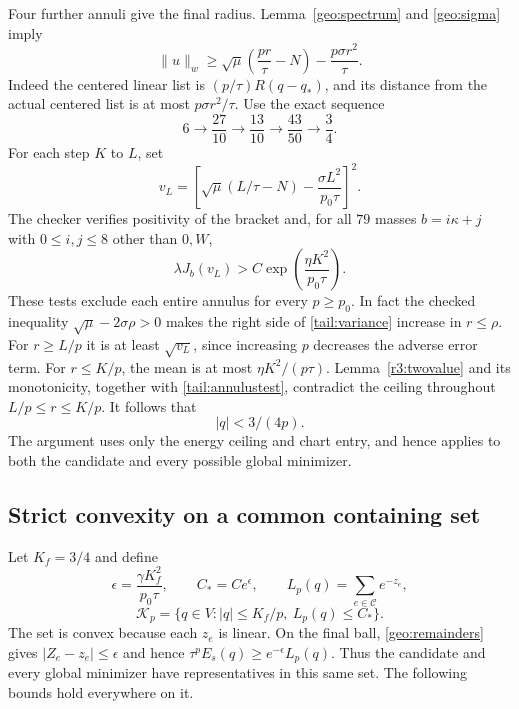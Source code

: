 \documentclass[12pt,reqno]{amsart}
\theoremstyle{definition}
\numberwithin{equation}{section}
\begin{document}
Four further annuli give the final radius. Lemma~\ref{geo:spectrum}
and \eqref{geo:sigma} imply
\begin{equation}\label{tail:variance}
 \|u\|_w\ge
 \sqrt\mu\left(\frac{pr}\tau-N\right)-\frac{p\sigma r^2}\tau.
\end{equation}
Indeed the centered linear list is $(p/\tau)R(q-q_*)$, and its
distance from the actual centered list is at most $p\sigma r^2/\tau$.
Use the exact sequence
\[
 6\longrightarrow\frac{27}{10}\longrightarrow\frac{13}{10}
       \longrightarrow\frac{43}{50}\longrightarrow\frac34.
\]
For each step $K$ to $L$, set
\[
 v_L=\left[\sqrt\mu(L/\tau-N)-\frac{\sigma L^2}{p_0\tau}\right]^2.
\]
The checker verifies positivity of the bracket and, for all $79$
masses $b=i\kappa+j$ with $0\le i,j\le8$ other than $0,W$,
\begin{equation}\label{tail:annulustest}
 \lambda J_b(v_L)>C\exp\left(\frac{\eta K^2}{p_0\tau}\right).
\end{equation}
These tests exclude each entire annulus for every $p\ge p_0$.
In fact the checked inequality $\sqrt\mu-2\sigma\rho>0$ makes
the right side of \eqref{tail:variance} increase in $r\le\rho$.
For $r\ge L/p$ it is at least $\sqrt{v_L}$, since increasing $p$
decreases the adverse error term. For $r\le K/p$, the mean is at
most $\eta K^2/(p\tau)$. Lemma~\ref{r3:twovalue} and its monotonicity,
together with \eqref{tail:annulustest}, contradict the ceiling throughout
$L/p\le r\le K/p$. It follows that
\begin{equation}\label{tail:finalradius}
 |q|<3/(4p).
\end{equation}
The argument uses only the energy ceiling and chart entry, and hence
applies to both the candidate and every possible global minimizer.

\subsection{Strict convexity on a common containing set}
Let $K_f=3/4$ and define
\[
 \epsilon=\frac{\gamma K_f^2}{p_0\tau},\qquad
 C_*=Ce^\epsilon,\qquad L_p(q)=\sum_{e\in\mathcal C}e^{-z_e},
\]
\begin{equation}\label{tail:convexset}
 \mathcal K_p=\{q\in V:|q|\le K_f/p,\ L_p(q)\le C_*\}.
\end{equation}
The set is convex because each $z_e$ is linear. On the final ball,
\eqref{geo:remainders} gives $|Z_e-z_e|\le\epsilon$ and hence
$\tau^pE_s(q)\ge e^{-\epsilon}L_p(q)$.
Thus the candidate and every global minimizer have representatives
in this same set. The following bounds hold everywhere on it.
\end{document}
